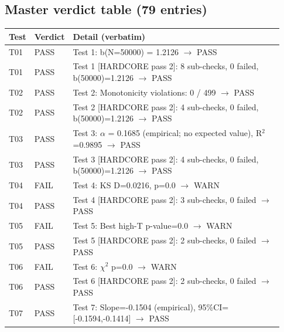 \documentclass[10pt]{article}
\begin{document}
\subsection{Master verdict table (79 entries)}

\begin{longtable}{p{0.06\linewidth} p{0.09\linewidth} p{0.78\linewidth}}
\toprule
\textbf{Test} & \textbf{Verdict} & \textbf{Detail (verbatim)} \\
\midrule
\endhead

T01 & PASS & Test 1: b(N=50000) = 1.2126 $\rightarrow$ PASS \\

T01 & PASS & Test 1 [HARDCORE pass 2]: 8 sub-checks, 0 failed, b(50000)=1.2126 $\rightarrow$ PASS \\

T02 & PASS & Test 2: Monotonicity violations: 0 / 499 $\rightarrow$ PASS \\

T02 & PASS & Test 2 [HARDCORE pass 2]: 4 sub-checks, 0 failed, b(50000)=1.2126 $\rightarrow$ PASS \\

T03 & PASS & Test 3: $\alpha$ = 0.1685 (empirical; no expected value), R$^2$=0.9895 $\rightarrow$ PASS \\

T03 & PASS & Test 3 [HARDCORE pass 2]: 4 sub-checks, 0 failed, b(50000)=1.2126 $\rightarrow$ PASS \\

T04 & FAIL & Test 4: KS D=0.0216, p=0.0 $\rightarrow$ WARN \\

T04 & PASS & Test 4 [HARDCORE pass 2]: 3 sub-checks, 0 failed $\rightarrow$ PASS \\

T05 & FAIL & Test 5: Best high-T p-value=0.0 $\rightarrow$ WARN \\

T05 & PASS & Test 5 [HARDCORE pass 2]: 2 sub-checks, 0 failed $\rightarrow$ PASS \\

T06 & FAIL & Test 6: $\chi$$^2$ p=0.0 $\rightarrow$ WARN \\

T06 & PASS & Test 6 [HARDCORE pass 2]: 2 sub-checks, 0 failed $\rightarrow$ PASS \\

T07 & PASS & Test 7: Slope=-0.1504 (empirical), 95\%CI=[-0.1594,-0.1414] $\rightarrow$ PASS \\


\end{longtable}
\end{document}
